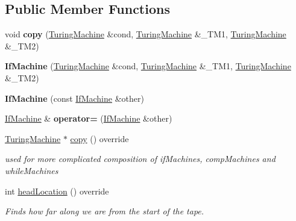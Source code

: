 \subsection*{Public Member Functions}
\begin{DoxyCompactItemize}
\item 
\mbox{\label{class_if_machine_a52a2550f6ee14ff51e1a79eb86acf903}} 
void {\bfseries copy} (\mbox{\hyperlink{class_turing_machine}{Turing\+Machine}} \&cond, \mbox{\hyperlink{class_turing_machine}{Turing\+Machine}} \&\+\_\+\+T\+M1, \mbox{\hyperlink{class_turing_machine}{Turing\+Machine}} \&\+\_\+\+T\+M2)
\item 
\mbox{\label{class_if_machine_ad4feea24920d0ad4f556dd5a17373a4a}} 
{\bfseries If\+Machine} (\mbox{\hyperlink{class_turing_machine}{Turing\+Machine}} \&cond, \mbox{\hyperlink{class_turing_machine}{Turing\+Machine}} \&\+\_\+\+T\+M1, \mbox{\hyperlink{class_turing_machine}{Turing\+Machine}} \&\+\_\+\+T\+M2)
\item 
\mbox{\label{class_if_machine_a1ea4d13598bb36c72053a392418e51d7}} 
{\bfseries If\+Machine} (const \mbox{\hyperlink{class_if_machine}{If\+Machine}} \&other)
\item 
\mbox{\label{class_if_machine_a2f6956f150976446f6f495ad6804ae37}} 
\mbox{\hyperlink{class_if_machine}{If\+Machine}} \& {\bfseries operator=} (\mbox{\hyperlink{class_if_machine}{If\+Machine}} \&other)
\item 
\mbox{\label{class_if_machine_a72d5b2672deb3f5508ab0e60fed174c7}} 
\mbox{\hyperlink{class_turing_machine}{Turing\+Machine}} $\ast$ \mbox{\hyperlink{class_if_machine_a72d5b2672deb3f5508ab0e60fed174c7}{copy}} () override
\begin{DoxyCompactList}\small\item\em used for more complicated composition of if\+Machines, comp\+Machines and while\+Machines \end{DoxyCompactList}\item 
\mbox{\label{class_if_machine_ac2f2f2832000841d864fe01d43c8406d}} 
int \mbox{\hyperlink{class_if_machine_ac2f2f2832000841d864fe01d43c8406d}{head\+Location}} () override
\begin{DoxyCompactList}\small\item\em Finds how far along we are from the start of the tape. \end{DoxyCompactList}\item 

\end{DoxyCompactItemize}
